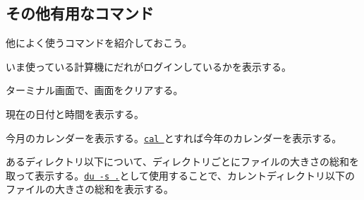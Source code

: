 \subsection{その他有用なコマンド}
他によく使うコマンドを紹介しておこう。
\begin{itemize}

  いま使っている計算機にだれがログインしているかを表示する。
  

  ターミナル画面で、画面をクリアする。


  現在の日付と時間を表示する。


  今月のカレンダーを表示する。\underline{\tt cal \nendo}とすれば今年のカレンダーを表示する。
  

  あるディレクトリ以下について、ディレクトリごとにファイルの大きさの総和を取って表示する。\underline{\tt du -s .}として使用することで、カレントディレクトリ以下のファイルの大きさの総和を表示する。

  \label{sect: tar}
  

\end{itemize}
